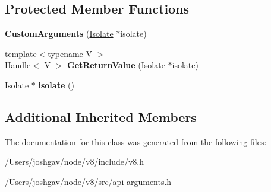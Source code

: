 \subsection*{Protected Member Functions}
\begin{DoxyCompactItemize}
\item 
{\bfseries Custom\+Arguments} (\hyperlink{classv8_1_1internal_1_1_isolate}{Isolate} $\ast$isolate)\hypertarget{classv8_1_1internal_1_1_custom_arguments_a4269b099942f91e5ce1deaff371e1330}{}\label{classv8_1_1internal_1_1_custom_arguments_a4269b099942f91e5ce1deaff371e1330}

\item 
{\footnotesize template$<$typename V $>$ }\\\hyperlink{classv8_1_1internal_1_1_handle}{Handle}$<$ V $>$ {\bfseries Get\+Return\+Value} (\hyperlink{classv8_1_1internal_1_1_isolate}{Isolate} $\ast$isolate)\hypertarget{classv8_1_1internal_1_1_custom_arguments_ac12aff15a5c0df261941c81c22ce7a54}{}\label{classv8_1_1internal_1_1_custom_arguments_ac12aff15a5c0df261941c81c22ce7a54}

\item 
\hyperlink{classv8_1_1internal_1_1_isolate}{Isolate} $\ast$ {\bfseries isolate} ()\hypertarget{classv8_1_1internal_1_1_custom_arguments_a144347b17b87f729468c79c88a0b7686}{}\label{classv8_1_1internal_1_1_custom_arguments_a144347b17b87f729468c79c88a0b7686}

\end{DoxyCompactItemize}
\subsection*{Additional Inherited Members}


The documentation for this class was generated from the following files\+:\begin{DoxyCompactItemize}
\item 
/\+Users/joshgav/node/v8/include/v8.\+h\item 
/\+Users/joshgav/node/v8/src/api-\/arguments.\+h\end{DoxyCompactItemize}
